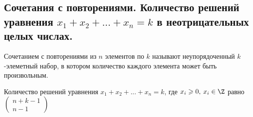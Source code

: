 \subsection{Сочетания с повторениями. Количество решений уравнения $x_1 + x_2 + . . . + x_n = k$ в неотрицательных целых числах.}
Сочетанием с повторениями из $n$ элементов по $k$ называют неупорядоченный $k$-элеметный набор, в котором количество каждого элемента может быть произвольным.

Количество решений уравнения $x_1 + x_2 + ... + x_n = k$, где $x_i \geqslant 0, \: x_i \in \Z$ равно $\displaystyle \begin{pmatrix}n+k-1\\n-1\end{pmatrix}$